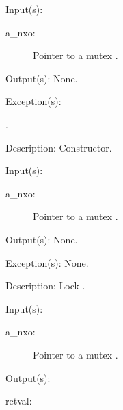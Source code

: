 \begin{capi}
\label{nxo_mutex_new}
	\begin{capilist}
	\item[Input(s): ]
		\begin{description}\item[]
		\item[a\_nxo: ]
			Pointer to a mutex .
		\end{description}
	\item[Output(s): ] None.
	\item[Exception(s): ]
		\begin{description}\item[]
		\item[.]
		\end{description}
	\item[Description: ]
		Constructor.
	\end{capilist}
\label{nxo_mutex_lock}
	\begin{capilist}
	\item[Input(s): ]
		\begin{description}\item[]
		\item[a\_nxo: ]
			Pointer to a mutex \classname{nxo}.
		\end{description}
	\item[Output(s): ] None.
	\item[Exception(s): ] None.
	\item[Description: ]
		Lock \cvar{a\_nxo}.
	\end{capilist}
\label{nxo_mutex_trylock}
	\begin{capilist}
	\item[Input(s): ]
		\begin{description}\item[]
		\item[a\_nxo: ]
			Pointer to a mutex .
		\end{description}
	\item[Output(s): ]
		\begin{description}\item[]
		\item[retval: ]

\end{description}
\end{capilist}
\end{capi}
